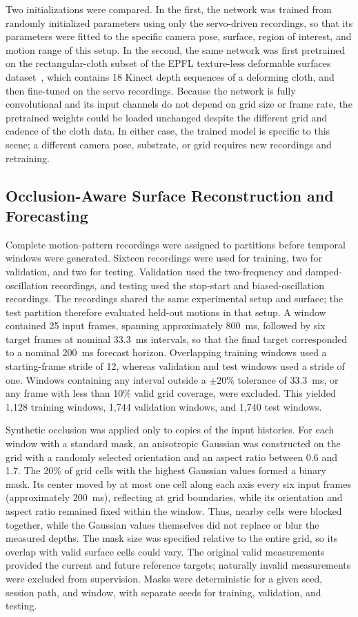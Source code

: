 Two initializations were compared. In the first, the network was trained from randomly initialized parameters using only the servo-driven recordings, so that its parameters were fitted to the specific camera pose, surface, region of interest, and motion range of this setup. In the second, the same network was first pretrained on the rectangular-cloth subset of the EPFL texture-less deformable surfaces dataset~\cite{bednarik2018tds}, which contains 18 Kinect depth sequences of a deforming cloth, and then fine-tuned on the servo recordings. Because the network is fully convolutional and its input channels do not depend on grid size or frame rate, the pretrained weights could be loaded unchanged despite the different grid and cadence of the cloth data. In either case, the trained model is specific to this scene; a different camera pose, substrate, or grid requires new recordings and retraining.


\subsection{Occlusion-Aware Surface Reconstruction and Forecasting}
Complete motion-pattern recordings were assigned to partitions before temporal windows were generated. Sixteen recordings were used for training, two for validation, and two for testing. Validation used the two-frequency and damped-oscillation recordings, and testing used the stop-start and biased-oscillation recordings. The recordings shared the same experimental setup and surface; the test partition therefore evaluated held-out motions in that setup. A window contained 25 input frames, spanning approximately 800~ms, followed by six target frames at nominal 33.3~ms intervals, so that the final target corresponded to a nominal 200~ms forecast horizon. Overlapping training windows used a starting-frame stride of 12, whereas validation and test windows used a stride of one. Windows containing any interval outside a $\pm20\%$ tolerance of 33.3~ms, or any frame with less than 10\% valid grid coverage, were excluded. This yielded 1,128 training windows, 1,744 validation windows, and 1,740 test windows.

Synthetic occlusion was applied only to copies of the input histories. For each window with a standard mask, an anisotropic Gaussian was constructed on the grid with a randomly selected orientation and an aspect ratio between 0.6 and 1.7. The 20\% of grid cells with the highest Gaussian values formed a binary mask. Its center moved by at most one cell along each axis every six input frames (approximately 200~ms), reflecting at grid boundaries, while its orientation and aspect ratio remained fixed within the window. Thus, nearby cells were blocked together, while the Gaussian values themselves did not replace or blur the measured depths. The mask size was specified relative to the entire grid, so its overlap with valid surface cells could vary. The original valid measurements provided the current and future reference targets; naturally invalid measurements were excluded from supervision. Masks were deterministic for a given seed, session path, and window, with separate seeds for training, validation, and testing.


